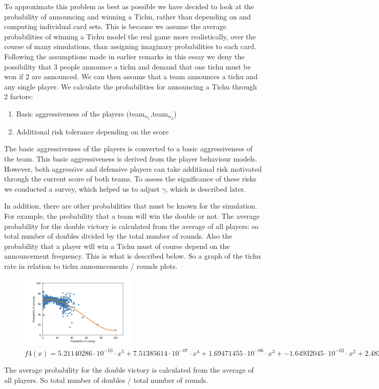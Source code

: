 To approximate this problem as best as possible we have decided to look at the probability of announcing and winning a Tichu, rather than depending on and computing individual card sets. This is because we assume the average probabilities of winning a Tichu model the real game more realistically, over the course of many simulations, than assigning imaginary probabilities to each card. Following the assumptions made in earlier remarks in this essay we deny the possibility that 3 people announce a tichu and demand that one tichu must be won if 2 are announced. We can then assume that a team announces a tichu and any single player. We calculate the probabilities for announcing a Tichu through 2 factors:
\begin{enumerate}
\item Basic aggressiveness of the players (team$_{\alpha_1}$,team$_{\alpha_2}$)
\item  Additional risk tolerance depending on the score
\end{enumerate}
The basic aggressiveness of the players is converted to a basic aggressiveness of the team. This basic aggressiveness is derived from the player behaviour models. However, both aggressive and defensive players can take additional risk motivated through the current score of both teams. To assess the significance of these risks we conducted a survey, which helped us to adjust $\gamma$, which is described later.

In addition, there are other probabilities that must be known for the simulation. For example, the probability that a team will win the double or not. The average probability for the double victory is calculated from the average of all players: so total number of doubles divided by the total number of rounds. Also the probability that a player will win a Tichu must of course depend on the announcement frequency. This is what is described below.
So a graph of the tichu rate in relation to tichu announcements / rounds plots.
\begin{figure}[h]
    \centering
    \includegraphics[width=0.5\textwidth]{Bilder/calling_winning_graph}
    \caption{$f4(x)=5.21140286\cdot 10^{-10}\cdot x^5+  7.51385614\cdot 10^{-07}\cdot x^4+  1.69471455\cdot 10^{-06}\cdot x^3+ -1.64932045\cdot 10^{-02}\cdot x^2+2.48230296\cdot 10^{-01}\cdot x + 67.7185027$}
    \label{fig:13}
\end{figure}
The average probability for the double victory is calculated from the average of all players. So total number of doubles / total number of rounds.

